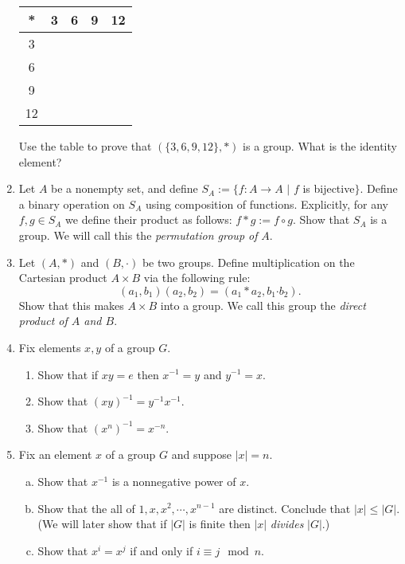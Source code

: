 \documentclass[11pt]{article}
\begin{document}
\begin{enumerate}
	      \begin{center}
		      \begin{tabular}{c|c|c|c|c}
			      *  & 3 & 6 & 9 & 12 \\
			      \hline
			      3  &   &   &   &    \\
			      \hline
			      6  &   &   &   &    \\
			      \hline
			      9  &   &   &   &    \\
			      \hline
			      12 &   &   &   &
		      \end{tabular}
	      \end{center}
	      Use the table to prove that $\left(\{3,6,9,12\},*\right)$ is a group.  What is the identity element?
	\item Let $A$ be a nonempty set, and define $S_A:=\{f:A\to A$ $|$ $f$ is bijective$\}$.  Define a binary operation  on $S_A$ using composition of functions.   Explicitly, for any $f,g\in S_A$ we define their product as follows: $f*g := f\circ g$.  Show that $S_A$ is a group.  We will call this the \textit{permutation group of }$A$.
  \item{
  Let $(A,*)$ and $(B,\boldsymbol{\cdot})$ be two groups.  Define multiplication on the Cartesian product $A\times B$ via the following rule:
  \[(a_1,b_1)(a_2,b_2) = (a_1*a_2,b_1\boldsymbol{\cdot}b_2).\]
  Show that this makes $A\times B$ into a group.  We call this group the \textit{direct product of $A$ and $B$}.
  }
	\item{
  Fix elements $x,y$ of a group $G$.
  \begin{enumerate}
    \item{
    Show that if $xy=e$ then $x^{-1}=y$ and $y^{-1}=x$.
    }
    \item{
    Show that $(xy)^{-1} = y^{-1}x^{-1}$.
    }
    \item{
    Show that $(x^n)^{-1} = x^{-n}$.
    }
  \end{enumerate}
  }
	\item Fix an element $x$ of a group $G$ and suppose $|x| = n$.
  \begin{enumerate}[(a)]
    \item Show that $x^{-1}$ is a nonnegative power of $x$.
		\item Show that the all of $1,x,x^2,\cdots,x^{n-1}$ are distinct.  Conclude that $|x|\le|G|$.  (We will later show that if $|G|$ is finite then $|x|$ \textit{divides} $|G|$.)
		\item Show that $x^i=x^j$ if and only if $i\equiv j\mod n$.
	\end{enumerate}

\end{enumerate}
\end{document}
